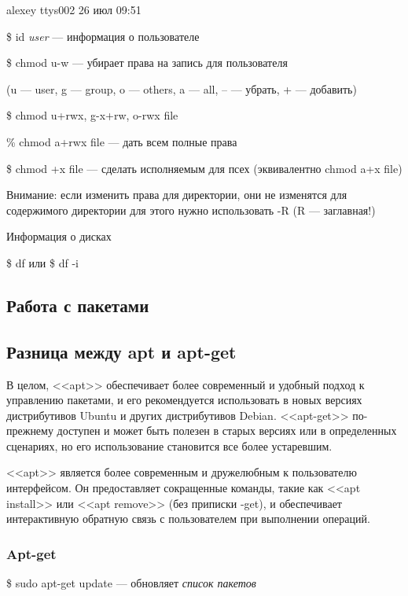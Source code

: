 \documentclass[oneside, final, 14pt]{extreport} %
\begin{document}
alexey           ttys002      26 июл 09:51 

\vspace{\baselineskip}


\$ id \textit{user} --- информация о пользователе

\$ chmod u-w --- убирает права на запись для пользователя

(u --- user, g --- group, o --- others, a --- all, \--- --- убрать, + --- добавить)

\$ chmod u+rwx, g-x+rw, o-rwx file

\% chmod a+rwx file --- дать всем полные права

\$ chmod +x file --- сделать исполняемым для псех (эквивалентно chmod a+x file)

Внимание: если изменить права для директории, они не изменятся для содержимого директории
для этого нужно использовать \--R (R --- заглавная!)

Информация о дисках

\$ df или \$ df -i

\vspace*{\baselineskip}


\subsection{Работа с пакетами}

\subsection*{Разница между apt и apt-get}
В целом, <<apt>> обеспечивает более современный и удобный подход к управлению пакетами, и его рекомендуется использовать в новых версиях дистрибутивов Ubuntu и других дистрибутивов Debian. <<apt-get>> по-прежнему доступен и может быть полезен в старых версиях или в определенных сценариях, но его использование становится все более устаревшим.

<<apt>> является более современным и дружелюбным к пользователю интерфейсом. Он предоставляет сокращенные команды, такие как <<apt install>> или <<apt remove>> (без приписки \--get), и обеспечивает интерактивную обратную связь с пользователем при выполнении операций.




\subsubsection*{Apt-get}

\$ sudo apt-get update --- обновляет \textit{список пакетов}
\end{document}
